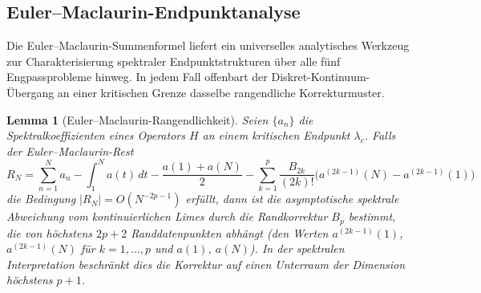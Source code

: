 \documentclass[12pt,a4paper]{article}
\newtheorem{lemma}[theorem]{Lemma}
\theoremstyle{definition}
\theoremstyle{remark}
\begin{document}
\subsection{Euler--Maclaurin-Endpunktanalyse}
\label{sec:euler-maclaurin}

Die Euler--Maclaurin-Summenformel liefert ein universelles analytisches Werkzeug zur Charakterisierung spektraler Endpunktstrukturen über alle fünf Engpassprobleme hinweg. In jedem Fall offenbart der Diskret-Kontinuum-Übergang an einer kritischen Grenze dasselbe rangendliche Korrekturmuster.

\begin{lemma}[Euler--Maclaurin-Rangendlichkeit]
\label{lem:em-rank}
Seien $\{a_n\}$ die Spektralkoeffizienten eines Operators $H$ an einem kritischen Endpunkt $\lambda_c$. Falls der Euler--Maclaurin-Rest
\[
R_N = \sum_{n=1}^{N} a_n - \int_1^N a(t)\,dt - \frac{a(1)+a(N)}{2} - \sum_{k=1}^{p} \frac{B_{2k}}{(2k)!}\bigl(a^{(2k-1)}(N) - a^{(2k-1)}(1)\bigr)
\]
die Bedingung $|R_N| = O(N^{-2p-1})$ erfüllt, dann ist die asymptotische spektrale Abweichung vom kontinuierlichen Limes durch die Randkorrektur $B_p$ bestimmt, die von höchstens $2p+2$ Randdatenpunkten abhängt \textup{(}den Werten $a^{(2k-1)}(1)$, $a^{(2k-1)}(N)$ für $k = 1,\ldots,p$ und $a(1)$, $a(N)$\textup{)}. In der spektralen Interpretation beschränkt dies die Korrektur auf einen Unterraum der Dimension höchstens $p+1$.
\end{lemma}
\end{document}
